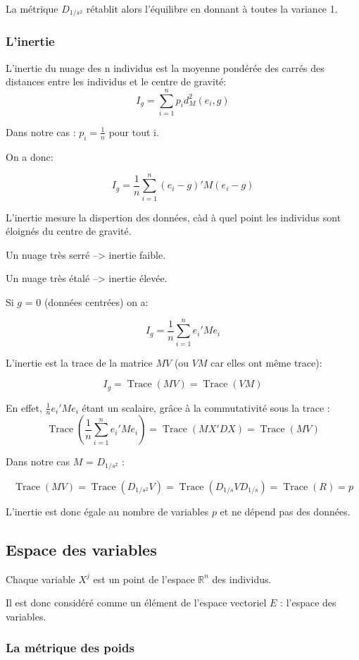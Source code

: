 \documentclass[12pt,a4paper]{article}
\begin{document}
La métrique $D_{1/s^2}$ rétablit alors l'équilibre en donnant à toutes la variance 1.

\subsubsection{L'inertie}

L'inertie du nuage des n individus est la moyenne pondérée des carrés des distances entre les individus et le centre de gravité:
\[I_g = \sum_{i=1}^n p_i d_M^2(e_i, g)\]

Dans notre cas : $p_i = \frac{1}{n}$ pour tout i.

On a donc:

\[I_g = \frac{1}{n} \sum_{i=1}^n (e_i - g)' M (e_i - g)\]

L'inertie mesure la dispertion des données, càd à quel point les individus sont éloignés du centre de gravité.

Un nuage très serré --> inertie faible.

Un nuage très étalé --> inertie élevée.

Si $g$ = 0 (données centrées) on a:

\[I_g = \frac{1}{n} \sum_{i=1}^n e_i' M e_i \]

L'inertie est la trace de la matrice $M V$ (ou $V M$ car elles ont même trace):

\[I_g = \operatorname{Trace}(M V) = \operatorname{Trace}(V M)\]

En effet, $\frac{1}{n} e_i' M e_i$ étant un scalaire, grâce à la commutativité sous la trace : 
\[\operatorname{Trace}(\frac{1}{n} \sum_{i=1}^n e_i' M e_i) = \operatorname{Trace}(M X' D X) = \operatorname{Trace}(MV)\] 

Dans notre cas $M$ = $D_{1/s^2}$ : 

\[\operatorname{Trace}(M V) = \operatorname{Trace}(D_{1/s^2} V) = \operatorname{Trace}(D_{1/s} V D_{1/s}) = \operatorname{Trace}(R) = p\]

L'inertie est donc égale au nombre de variables $p$ et ne dépend pas des données.

\subsection{Espace des variables}
Chaque variable $X^{j}$ est un point de l'espace $\mathbb{R}^n$ des individus.

Il est donc considéré comme un élément de l'espace vectoriel $E$ : l'espace des variables.

\subsubsection{La métrique des poids}
\end{document}
